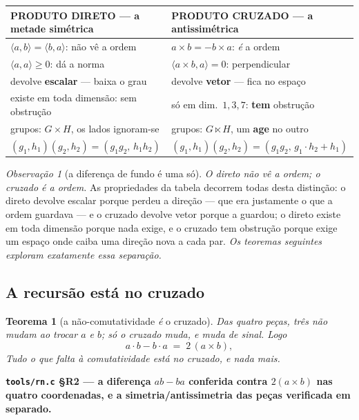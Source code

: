 \documentclass[11pt]{article}
\newcommand{\code}[1]{\texttt{\small #1}}
\theoremstyle{plain}
\newtheorem{teorema}{Teorema}
\theoremstyle{remark}
\newtheorem{obs}{Observação}
\providecommand{\medido}[1]{\textbf{#1}}
\begin{document}
\begin{center}
\begin{tabular}{ll}
\toprule
\textbf{PRODUTO DIRETO} --- a metade simétrica & \textbf{PRODUTO CRUZADO} --- a antissimétrica \\
\midrule
$\langle a,b\rangle=\langle b,a\rangle$: não vê a ordem & $a\times b=-b\times a$: \emph{é} a ordem \\
$\langle a,a\rangle\ge0$: dá a norma & $\langle a\times b,a\rangle=0$: perpendicular \\
devolve \textbf{escalar} --- baixa o grau & devolve \textbf{vetor} --- fica no espaço \\
existe em toda dimensão: sem obstrução & só em dim.\ $1,3,7$: \textbf{tem} obstrução \\
grupos: $G\times H$, os lados ignoram-se & grupos: $G\ltimes H$, um \textbf{age} no outro \\
$(g_1,h_1)(g_2,h_2)=(g_1g_2,\,h_1h_2)$ & $(g_1,h_1)(g_2,h_2)=(g_1g_2,\,g_1{\cdot}h_2+h_1)$ \\
\bottomrule
\end{tabular}
\end{center}

\begin{obs}[a diferença de fundo é uma só]
\emph{O direto não vê a ordem; o cruzado é a ordem.} As propriedades da tabela decorrem todas
desta distinção: o direto devolve escalar porque perdeu a direção --- que era justamente o que a
ordem guardava --- e o cruzado devolve vetor porque a guardou; o direto existe em toda dimensão
porque nada exige, e o cruzado tem obstrução porque exige um espaço onde caiba uma direção nova a
cada par. \emph{Os teoremas seguintes exploram exatamente essa separação.}
\end{obs}

\subsection{A recursão está no cruzado}

\begin{teorema}[a não-comutatividade \emph{é} o cruzado]
Das quatro peças, três não mudam ao trocar $a$ e $b$; só o cruzado muda, e muda de \emph{sinal}.
Logo
\[
 a\cdot b - b\cdot a \;=\; 2\,(a\times b),
\]
\emph{Tudo o que falta à comutatividade está no cruzado, e nada mais.}
\end{teorema}
\medido{\code{tools/rn.c} §R2 --- a diferença $ab-ba$ conferida contra $2(a\times b)$ nas quatro
coordenadas, e a simetria/antissimetria das peças verificada em separado.}
\end{document}
